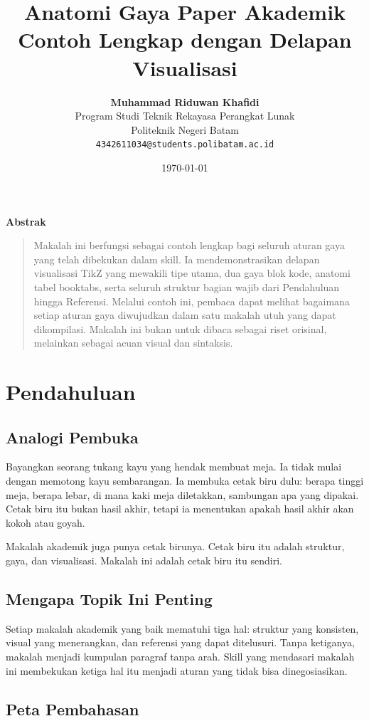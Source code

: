 \documentclass[11pt,a4paper]{article}
\title{\vspace{-1.5cm}\textbf{\sffamily\LARGE Anatomi Gaya Paper Akademik\\ Contoh Lengkap dengan Delapan Visualisasi}}
\author{
	\textbf{Muhammad Riduwan Khafidi} \\
	\small Program Studi Teknik Rekayasa Perangkat Lunak \\
	\small Politeknik Negeri Batam \\
	\small \texttt{4342611034@students.polibatam.ac.id}
}
\date{\small\today}
\renewenvironment{abstract}
{\small
	\begin{center}\textbf{\sffamily Abstrak}\end{center}
	\begin{quote}}
	{\end{quote}}
\begin{document}
\maketitle
\thispagestyle{empty}

\begin{abstract}
	Makalah ini berfungsi sebagai contoh lengkap bagi seluruh aturan gaya yang telah dibekukan dalam skill. Ia mendemonstrasikan delapan visualisasi TikZ yang mewakili tipe utama, dua gaya blok kode, anatomi tabel booktabs, serta seluruh struktur bagian wajib dari Pendahuluan hingga Referensi. Melalui contoh ini, pembaca dapat melihat bagaimana setiap aturan gaya diwujudkan dalam satu makalah utuh yang dapat dikompilasi. Makalah ini bukan untuk dibaca sebagai riset orisinal, melainkan sebagai acuan visual dan sintaksis.
\end{abstract}

\section{Pendahuluan}

\subsection{Analogi Pembuka}

Bayangkan seorang tukang kayu yang hendak membuat meja. Ia tidak mulai dengan memotong kayu sembarangan. Ia membuka cetak biru dulu: berapa tinggi meja, berapa lebar, di mana kaki meja diletakkan, sambungan apa yang dipakai. Cetak biru itu bukan hasil akhir, tetapi ia menentukan apakah hasil akhir akan kokoh atau goyah.

Makalah akademik juga punya cetak birunya. Cetak biru itu adalah struktur, gaya, dan visualisasi. Makalah ini adalah cetak biru itu sendiri.

\subsection{Mengapa Topik Ini Penting}

Setiap makalah akademik yang baik mematuhi tiga hal: struktur yang konsisten, visual yang menerangkan, dan referensi yang dapat ditelusuri. Tanpa ketiganya, makalah menjadi kumpulan paragraf tanpa arah. Skill yang mendasari makalah ini membekukan ketiga hal itu menjadi aturan yang tidak bisa dinegosiasikan.

\subsection{Peta Pembahasan}
\end{document}
